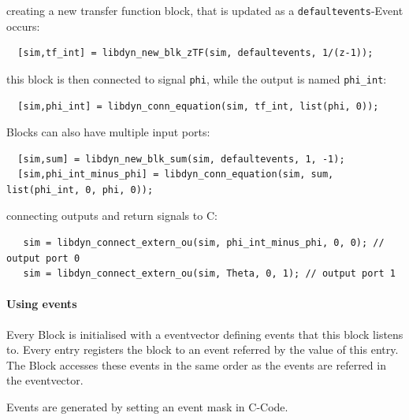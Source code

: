 \documentclass[%
	pdftex,%
	a4paper,%
	oneside,%
	11pt,%
	halfparskip,%
	headsepline,%
	bibtotocnumbered,%
	idxtotoc%
]{scrartcl}
\begin{document}
creating a new transfer function block, that is updated as a \texttt{defaultevents}-Event occurs:

\begin{verbatim}  
  [sim,tf_int] = libdyn_new_blk_zTF(sim, defaultevents, 1/(z-1));
\end{verbatim}

this block is then connected to signal \texttt{phi}, while the output is named \texttt{phi\_int}:

\begin{verbatim}
  [sim,phi_int] = libdyn_conn_equation(sim, tf_int, list(phi, 0));
\end{verbatim}

Blocks can also have multiple input ports:

\begin{verbatim}
  [sim,sum] = libdyn_new_blk_sum(sim, defaultevents, 1, -1);
  [sim,phi_int_minus_phi] = libdyn_conn_equation(sim, sum, list(phi_int, 0, phi, 0));
\end{verbatim}

connecting outputs and return signals to C:

\begin{verbatim}
   sim = libdyn_connect_extern_ou(sim, phi_int_minus_phi, 0, 0); // output port 0
   sim = libdyn_connect_extern_ou(sim, Theta, 0, 1); // output port 1
\end{verbatim}


\paragraph{Using events}

Every Block is initialised with a eventvector defining events that this block listens to. Every entry registers the block to an event referred by the value of this entry. The Block accesses these events in the same order as the events are referred in the eventvector. 


Events are generated by setting an event mask in C-Code.



% 
% 
% 
% 
% 
% 
% 
\end{document}
